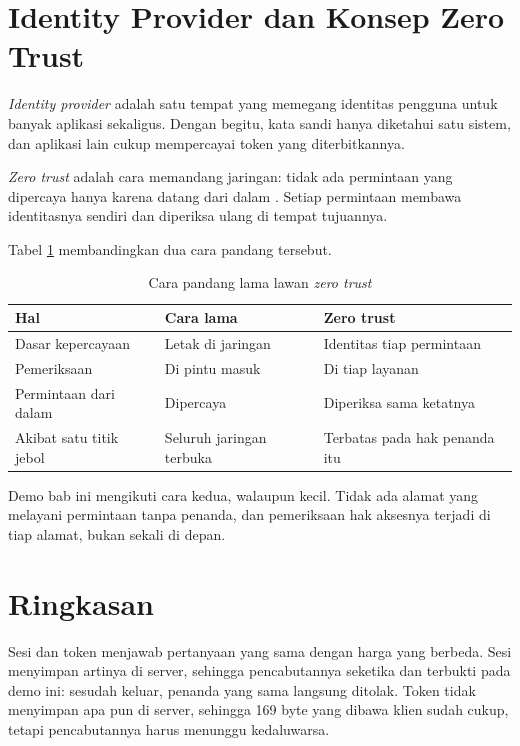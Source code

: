 \section{Identity Provider dan Konsep Zero Trust}

\textit{Identity provider} adalah satu tempat yang memegang identitas
pengguna untuk banyak aplikasi sekaligus. Dengan begitu, kata sandi hanya
diketahui satu sistem, dan aplikasi lain cukup mempercayai token yang
diterbitkannya.

\textit{Zero trust} adalah cara memandang jaringan: tidak ada permintaan yang
dipercaya hanya karena datang dari dalam \cite{nist-zero-trust}. Setiap
permintaan membawa identitasnya sendiri dan diperiksa ulang di tempat
tujuannya.

Tabel \ref{tab:zero-trust} membandingkan dua cara pandang tersebut.

\begin{table}[!htb]
  \centering
  \caption{Cara pandang lama lawan \textit{zero trust}}
  \label{tab:zero-trust}
  \begin{tabularx}{\textwidth}{lXX}
    \hline
    \textbf{Hal} & \textbf{Cara lama} & \textbf{Zero trust} \\
    \hline
    Dasar kepercayaan & Letak di jaringan & Identitas tiap permintaan \\
    \hline
    Pemeriksaan & Di pintu masuk & Di tiap layanan \\
    \hline
    Permintaan dari dalam & Dipercaya & Diperiksa sama ketatnya \\
    \hline
    Akibat satu titik jebol & Seluruh jaringan terbuka & Terbatas pada hak penanda itu \\
    \hline
  \end{tabularx}
\end{table}

Demo bab ini mengikuti cara kedua, walaupun kecil. Tidak ada alamat yang
melayani permintaan tanpa penanda, dan pemeriksaan hak aksesnya terjadi di
tiap alamat, bukan sekali di depan.

\section{Ringkasan}

Sesi dan token menjawab pertanyaan yang sama dengan harga yang berbeda. Sesi
menyimpan artinya di server, sehingga pencabutannya seketika dan terbukti
pada demo ini: sesudah keluar, penanda yang sama langsung ditolak. Token
tidak menyimpan apa pun di server, sehingga 169 byte yang dibawa klien sudah
cukup, tetapi pencabutannya harus menunggu kedaluwarsa.

